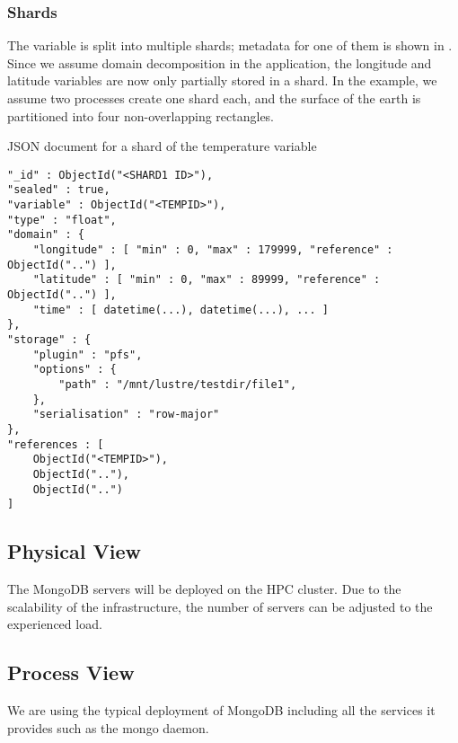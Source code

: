 \subsubsection{Shards}

The variable is split into multiple shards; metadata for one of them is shown in .
Since we assume domain decomposition in the application, the longitude and latitude variables are now only partially stored in a shard.
In the example, we assume two processes create one shard each, and the surface of the earth is partitioned into four non-overlapping rectangles.

\begin{tcbcode}[label={lst:mongotemperatureshard}]{JSON document for a shard of the temperature variable}
\begin{lstlisting}
"_id" : ObjectId("<SHARD1 ID>"),
"sealed" : true,
"variable" : ObjectId("<TEMPID>"),
"type" : "float",
"domain" : {
	"longitude" : [ "min" : 0, "max" : 179999, "reference" : ObjectId("..") ],
	"latitude" : [ "min" : 0, "max" : 89999, "reference" : ObjectId("..") ],
	"time" : [ datetime(...), datetime(...), ... ]
},
"storage" : {
	"plugin" : "pfs",
	"options" : {
		"path" : "/mnt/lustre/testdir/file1",
	},
	"serialisation" : "row-major"
},
"references : [
	ObjectId("<TEMPID>"),
	ObjectId(".."),
	ObjectId("..")
]
\end{lstlisting}
\end{tcbcode}


\subsection{Physical View}
\label{backend: mongo/physical}

The MongoDB servers will be deployed on the HPC cluster.
Due to the scalability of the infrastructure, the number of servers can be adjusted to the experienced load.


\subsection{Process View}
\label{backend: mongo/process}

We are using the typical deployment of MongoDB including all the services it provides such as the mongo daemon.

